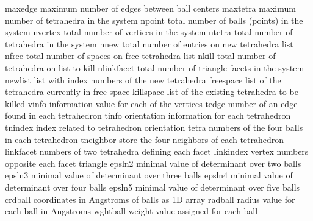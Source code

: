 \documentclass[letterpaper,11pt,english]{sphinxmanual}
\begin{document}
\begin{sphinxVerbatim}[commandchars=\\\{\}]
maxedge         maximum number of edges between ball centers
maxtetra        maximum number of tetrahedra in the system
npoint          total number of balls (points) in the system
nvertex         total number of vertices in the system
ntetra          total number of tetrahedra in the system
nnew            total number of entries on new tetrahedra list
nfree           total number of spaces on free tetrahedra list
nkill           total number of tetrahedra on list to kill
nlinkfacet      total number of triangle facets in the system
newlist         list with index numbers of the new tetrahedra
freespace       list of the tetrahedra currently in free space
killspace       list of the existing tetrahedra to be killed
vinfo           information value for each of the vertices
tedge           number of an edge found in each tetrahedron
tinfo           orientation information for each tetrahedron
tnindex         index related to tetrahedron orientation
tetra           numbers of the four balls in each tetrahedron
tneighbor       store the four neighbors of each tetrahedron
linkfacet       numbers of two tetrahedra defining each facet
linkindex       vertex numbers opposite each facet triangle
epsln2          minimal value of determinant over two balls
epsln3          minimal value of determinant over three balls
epsln4          minimal value of determinant over four balls
epsln5          minimal value of determinant over five balls
crdball         coordinates in Angstroms of balls as 1\PYGZhy{}D array
radball         radius value for each ball in Angstroms
wghtball        weight value assigned for each ball
\end{sphinxVerbatim}

\sphinxAtStartPar
{}
\end{document}
